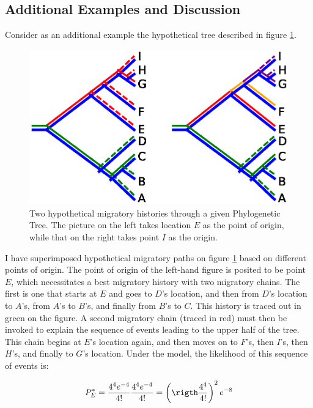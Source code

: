 \documentclass[11pt]{article}
\begin{document}
\subsection{Additional Examples and Discussion}

Consider as an additional example the hypothetical tree described in figure \ref{ex1}.

\begin{figure}
\begin{center}
\includegraphics[width=\textwidth]{AncillaryFiles//example1.eps}
\caption{Two hypothetical migratory histories through a given Phylogenetic Tree. The picture on the left takes location $E$ as the point of origin, while that on the right takes point $I$ as the origin. } \label{ex1}
\end{center} 
\end{figure}

I have superimposed hypothetical migratory paths on figure \ref{ex1} based on different points of origin. The point of origin of the left-hand figure is posited to be point $E$, which necessitates a best migratory history with two migratory chains.  The first is one that starts at $E$ and goes to $D$'s location, and then from $D$'s location to $A$'s, from $A$'s to $B$'s, and finally from $B$'s to $C$. This history is traced out in green on the figure. A second migratory chain (traced in red) must then be invoked to explain the sequence of events leading to the upper half of the tree. This chain begins at $E$'s location again, and then moves on to $F$'s, then $I$'s, then $H$'s, and finally to $G$'s location. Under the model, the likelihood of this sequence of events is:

\begin{equation*}
P^*_E =  \frac{4^4e^{-4}}{4!}\frac{4^4e^{-4}}{4!} =\left(\rigth\frac{4^4}{4!}\right)^2e^{-8}
\end{equation*}
\end{document}
